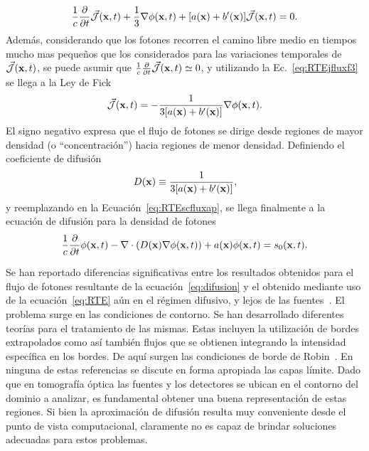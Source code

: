 \begin{equation}
\begin{split}
\begin{aligned}
\frac{1}{c}\frac{\partial}{\partial t} \vec{ \mathcal{J}}(\mathbf{x},t)+\frac{1}{3}\nabla  \phi(\mathbf{x},t) +[a(\mathbf{x})+b'(\mathbf{x})]\vec{ \mathcal{J}}(\mathbf{x},t)=0.
\end{aligned}
\end{split}
\label{eq:RTEjfluxf3}
\end{equation}
Además, considerando que los fotones 
recorren el camino libre medio en tiempos mucho 
mas pequeños que los considerados para las variaciones temporales de $\vec{ \mathcal{J}}(\mathbf{x},t)$, se 
puede asumir que $\frac{1}{c}\frac{\partial}{\partial t} \vec{ \mathcal{J}}(\mathbf{x},t) \simeq 0$, y utilizando la Ec.~\eqref{eq:RTEjfluxf3} se llega a la Ley de Fick
\begin{equation}
\begin{split}
\begin{aligned}
\vec{ \mathcal{J}}(\mathbf{x},t)=-\frac{1}{3[a(\mathbf{x})+b'(\mathbf{x})]} \nabla  \phi(\mathbf{x},t) .
\end{aligned}
\end{split}
\label{eq:Fick}
\end{equation}
El signo negativo expresa que el flujo de fotones se dirige desde regiones 
de mayor densidad (o ``concentración'') hacia regiones de menor densidad. 
Definiendo el coeficiente de difusión 
\begin{equation}
D(\mathbf{x})\equiv \frac{1}{3[a(\mathbf{x})+b'(\mathbf{x})]},
\end{equation}
y reemplazando en la Ecuación~\eqref{eq:RTEscfluxap}, se 
llega finalmente a la ecuación de difusión para la densidad de fotones
\begin{equation}
\frac{1}{c}\frac{\partial}{\partial t} \phi(\mathbf{x},t)-\nabla \cdot \left( D(\mathbf{x}) \nabla  \phi(\mathbf{x},t) \right)
+a(\mathbf{x})\phi(\mathbf{x},t)=s_0(\mathbf{x},t).
\label{eq:difusion}
\end{equation}

Se han 
reportado diferencias significativas entre los resultados obtenidos para el 
flujo de fotones resultante de la ecuación~\eqref{eq:difusion} y el obtenido 
mediante uso de la ecuación~\eqref{eq:RTE} aún 
en el régimen difusivo, y lejos de las fuentes~\cite{Hielscher1998}. El problema surge en las condiciones de contorno. Se han desarrollado diferentes teorías para el tratamiento de las 
mismas. Estas incluyen la utilización de bordes extrapolados como así también flujos que se obtienen integrando la intensidad 
específica en los bordes. De aquí surgen las condiciones de borde de Robin~\cite{Arridge2009,Haskell1994,Ishimaru1978,Arridge1999,Xu2002}. En ninguna de estas referencias se discute en forma apropiada las capas límite. Dado que en tomografía óptica las fuentes y los detectores 
se ubican en el contorno del dominio a analizar, es fundamental 
obtener una buena representación de estas regiones. 
Si bien la aproximación de difusión resulta muy conveniente 
desde el punto de vista computacional, claramente no 
es capaz de brindar soluciones adecuadas para estos problemas.
\pagebreak

